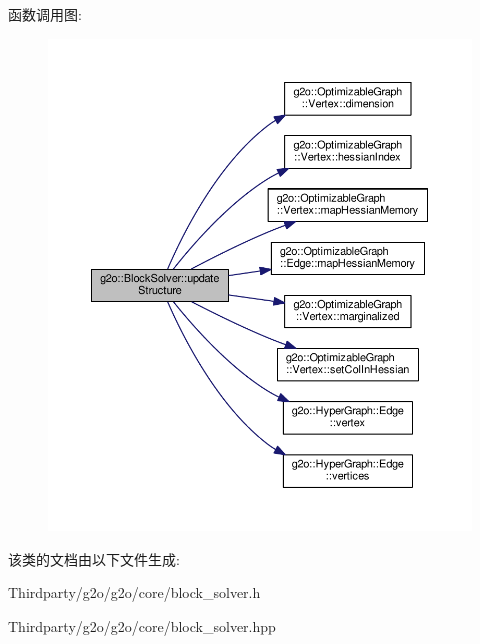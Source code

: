 函数调用图\-:
\nopagebreak
\begin{figure}[H]
\begin{center}
\leavevmode
\includegraphics[width=350pt]{classg2o_1_1BlockSolver_acc497239c5e681ddec2140e34dfc5938_cgraph}
\end{center}
\end{figure}




该类的文档由以下文件生成\-:\begin{DoxyCompactItemize}
\item 
Thirdparty/g2o/g2o/core/block\-\_\-solver.\-h\item 
Thirdparty/g2o/g2o/core/block\-\_\-solver.\-hpp\end{DoxyCompactItemize}
